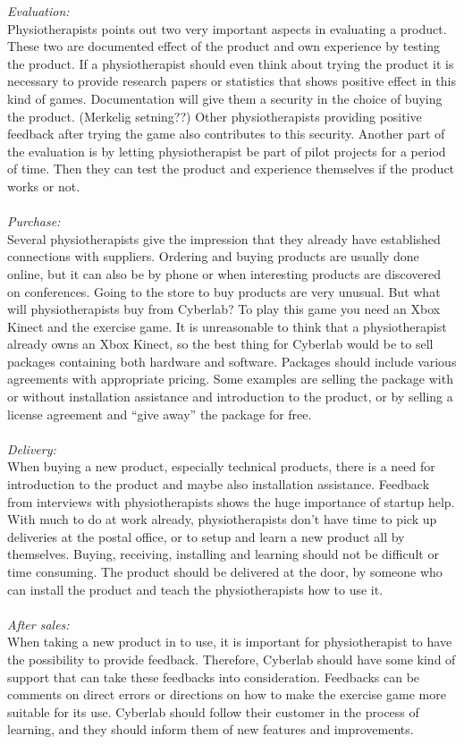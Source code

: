 \emph{Evaluation:}\\
Physiotherapists points out two very important aspects in evaluating a product. These two are documented effect of the product and own experience by testing the product. If a physiotherapist should even think about trying the product it is necessary to provide research papers or statistics that shows positive effect in this kind of games. Documentation will give them a security in the choice of buying the product. (Merkelig setning??) Other physiotherapists providing positive feedback after trying the game also contributes to this security. Another part of the evaluation is by letting physiotherapist be part of pilot projects for a period of time. Then they can test the product and experience themselves if the product works or not.\\ \\
\emph{Purchase:} \\
Several physiotherapists give the impression that they already have established connections with suppliers. Ordering and buying products are usually done online, but it can also be by phone or when interesting products are discovered on conferences. Going to the store to buy products are very unusual. But what will physiotherapists buy from Cyberlab? To play this game you need an Xbox Kinect and the exercise game. It is unreasonable to think that a physiotherapist already owns an Xbox Kinect, so the best thing for Cyberlab would be to sell packages containing both hardware and software.  Packages should include various agreements with appropriate pricing. Some examples are selling the package with or without installation assistance and introduction to the product, or by selling a license agreement and “give away” the package for free.\\ \\
\emph{Delivery:}\\
 When buying a new product, especially technical products, there is a need for introduction to the product and maybe also installation assistance. Feedback from interviews with physiotherapists shows the huge importance of startup help. With much to do at work already, physiotherapists don’t have time to pick up deliveries at the postal office, or to setup and learn a new product all by themselves. Buying, receiving, installing and learning should not be difficult or time consuming. The product should be delivered at the door, by someone who can install the product and teach the physiotherapists how to use it.\\ \\
\emph{After sales:}\\
When taking a new product in to use, it is important for physiotherapist to have the possibility to provide feedback. Therefore, Cyberlab should have some kind of support that can take these feedbacks into consideration. Feedbacks can be comments on direct errors or directions on how to make the exercise game more suitable for its use. Cyberlab should follow their customer in the process of learning, and they should inform them of new features and improvements.  
